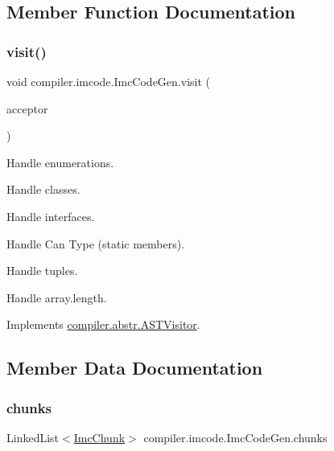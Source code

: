\subsection{Member Function Documentation}
\mbox{\label{classcompiler_1_1imcode_1_1_imc_code_gen_a33f9ebb6138825030983bfed9e1939d8}} 
\subsubsection{\texorpdfstring{visit()}{visit()}}
{\footnotesize\ttfamily void compiler.\+imcode.\+Imc\+Code\+Gen.\+visit (\begin{DoxyParamCaption}\item[{\hyperlink{classcompiler_1_1abstr_1_1tree_1_1expr_1_1_abs_bin_expr}{Abs\+Bin\+Expr}}]{acceptor }\end{DoxyParamCaption})}

Handle enumerations.

Handle classes.

Handle interfaces.

Handle Can Type (static members).

Handle tuples.

Handle array.\+length.

Implements \hyperlink{interfacecompiler_1_1abstr_1_1_a_s_t_visitor}{compiler.\+abstr.\+A\+S\+T\+Visitor}.



\subsection{Member Data Documentation}
\mbox{\label{classcompiler_1_1imcode_1_1_imc_code_gen_a6248a96bf4ba80edc4b429f5b4f49fc1}} 
\subsubsection{\texorpdfstring{chunks}{chunks}}
{\footnotesize\ttfamily Linked\+List$<$\hyperlink{classcompiler_1_1imcode_1_1_imc_chunk}{Imc\+Chunk}$>$ compiler.\+imcode.\+Imc\+Code\+Gen.\+chunks}


